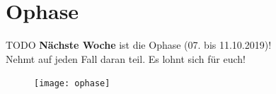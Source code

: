 \section{Ophase}
\begin{frame}
	\slidehead
	TODO
	\textbf{Nächste Woche} ist die Ophase (07. bis 11.10.2019)! \\
	Nehmt auf jeden Fall daran teil. Es lohnt sich für euch!
	\begin{figure}
		\centering
		\texttt{[image: ophase]}
	\end{figure}
\end{frame}


